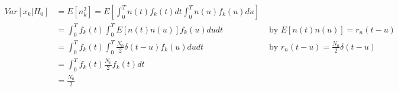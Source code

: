\begin{frame}
\begin{align*}
Var[x_k|H_0]&=E[n_k^2]=E[\int_{0}^{T}n(t)f_k(t)dt\int_{0}^{T}n(u)f_k(u)du]&\\
&=\int_{0}^{T}f_k(t)\int_{0}^{T}E[n(t)n(u)]f_k(u)dudt& \text{ by }E[n(t)n(u)]=r_n(t-u)\\
&=\int_{0}^{T}f_k(t)\int_{0}^{T}\frac{N_0}{2}\delta(t-u)f_k(u)dudt&\text{ by } r_n(t-u)=\frac{N_0}{2}\delta(t-u)\\
&=\int_{0}^{T}f_k(t)\frac{N_0}{2}f_k(t)dt&\\
&=\frac{N_0}{2}&
\end{align*}
\end{frame}


